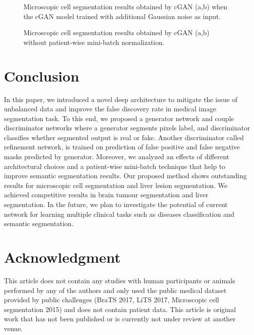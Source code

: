\documentclass[10pt,twocolumn,letterpaper]{article}
\begin{document}
\begin{figure*}[!t]
  \hfill
  \caption{Microscopic cell segmentation results obtained by cGAN (a,b) when the cGAN model trained  with additional Gaussian noise as input.}
\label{fig_cellnoise}
\end{figure*}\begin{figure*}[!t]
  \centering
  \hfill
  \caption{Microscopic cell segmentation results obtained by cGAN (a,b) without patient-wise mini-batch normalization.}
\label{fig_cellschaffel}
\end{figure*}

\section{Conclusion}\label{conclusion}
In this paper, we introduced a novel deep architecture to mitigate the issue of unbalanced data and improve the false discovery rate in medical image segmentation task.
To this end, we proposed a generator network and couple discriminator networks where a generator segments pixels label, and discriminator classifies whether segmented output is real or fake. Another discriminator called refinement network, is trained on prediction of false positive and false negative masks predicted by generator.
Moreover, we analyzed an effects of different architectural choices and a patient-wise mini-batch technique that help to improve semantic segmentation results.
Our proposed method shows outstanding results for microscopic cell segmentation and liver lesion segmentation.
We achieved competitive results in brain tumour segmentation and liver segmentation.
In the future, we plan to investigate the potential of current network for learning multiple clinical tasks such as diseases classification and semantic segmentation.

\section{Acknowledgment}
This article does not contain any studies with human participants or animals performed by any of the authors and only used the public medical dataset provided by public challenges (BraTS 2017, LiTS 2017, Microscopic cell segmentation 2015) and does not contain patient data. This article is original work that has not been published or is currently not under review at another venue.


{\small


}
\end{document}
